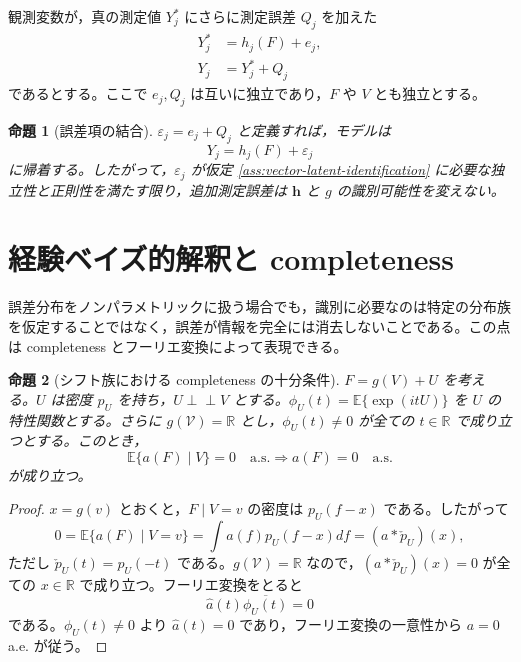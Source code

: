 \documentclass[dvipdfmx,autodetect-engine]{jsarticle}
\newtheorem{proposition}{命題}
\newcommand{\indep}{\mathrel{\perp\!\!\!\perp}}
\newcommand{\E}{\mathbb{E}}
\newcommand{\R}{\mathbb{R}}
\newcommand{\1}{\mathbf{1}}
\newcommand{\calV}{\mathcal{V}}
\begin{document}
観測変数が，真の測定値 $Y_j^*$ にさらに測定誤差 $Q_j$ を加えた
\begin{align}
  Y_j^*&=h_j(F)+e_j,\\
  Y_j&=Y_j^*+Q_j
\end{align}
であるとする。ここで $e_j,Q_j$ は互いに独立であり，$F$ や $V$ とも独立とする。

\begin{proposition}[誤差項の結合]
\label{prop:vector-error-combination}
$\varepsilon_j=e_j+Q_j$ と定義すれば，モデルは
\begin{equation}
  Y_j=h_j(F)+\varepsilon_j
\end{equation}
に帰着する。したがって，$\varepsilon_j$ が仮定 \ref{ass:vector-latent-identification} に必要な独立性と正則性を満たす限り，追加測定誤差は $\bm h$ と $g$ の識別可能性を変えない。
\end{proposition}

\section{経験ベイズ的解釈と completeness}

誤差分布をノンパラメトリックに扱う場合でも，識別に必要なのは特定の分布族を仮定することではなく，誤差が情報を完全には消去しないことである。この点は completeness とフーリエ変換によって表現できる。

\begin{proposition}[シフト族における completeness の十分条件]
\label{prop:fourier-completeness}
$F=g(V)+U$ を考える。$U$ は密度 $p_U$ を持ち，$U\indep V$ とする。$\phi_U(t)=\E\{\exp(itU)\}$ を $U$ の特性関数とする。さらに $g(\calV)=\R$ とし，$\phi_U(t)\neq0$ が全ての $t\in\R$ で成り立つとする。このとき，
\begin{equation}
  \E\{a(F)\mid V\}=0\quad \mathrm{a.s.}
  \Longrightarrow
  a(F)=0\quad \mathrm{a.s.}
\end{equation}
が成り立つ。
\end{proposition}

\begin{proof}
$x=g(v)$ とおくと，$F\mid V=v$ の密度は $p_U(f-x)$ である。したがって
\begin{equation}
  0=\E\{a(F)\mid V=v\}=\int a(f)p_U(f-x)df=(a*\check p_U)(x),
\end{equation}
ただし $\check p_U(t)=p_U(-t)$ である。$g(\calV)=\R$ なので，$(a*\check p_U)(x)=0$ が全ての $x\in\R$ で成り立つ。フーリエ変換をとると
\begin{equation}
  \widehat a(t)\overline{\phi_U(t)}=0
\end{equation}
である。$\phi_U(t)\neq0$ より $\widehat a(t)=0$ であり，フーリエ変換の一意性から $a=0$ a.e. が従う。
\end{proof}
\end{document}
